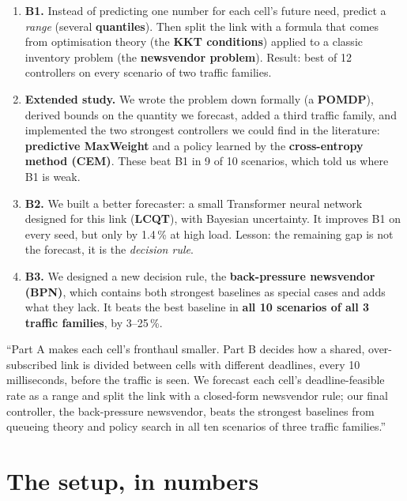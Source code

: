\documentclass[11pt,a4paper]{article}
\begin{document}
\begin{enumerate}
  \item \textbf{B1.} Instead of predicting one number for each cell's future need, predict a \emph{range} (several \textbf{quantiles}). Then split the link with a formula that comes from optimisation theory (the \textbf{KKT conditions}) applied to a classic inventory problem (the \textbf{newsvendor problem}). Result: best of 12 controllers on every scenario of two traffic families.
  \item \textbf{Extended study.} We wrote the problem down formally (a \textbf{POMDP}), derived bounds on the quantity we forecast, added a third traffic family, and implemented the two strongest controllers we could find in the literature: \textbf{predictive MaxWeight} and a policy learned by the \textbf{cross-entropy method (CEM)}. These beat B1 in 9 of 10 scenarios, which told us where B1 is weak.
  \item \textbf{B2.} We built a better forecaster: a small Transformer neural network designed for this link (\textbf{LCQT}), with Bayesian uncertainty. It improves B1 on every seed, but only by 1.4\,\% at high load. Lesson: the remaining gap is not the forecast, it is the \emph{decision rule}.
  \item \textbf{B3.} We designed a new decision rule, the \textbf{back-pressure newsvendor (BPN)}, which contains both strongest baselines as special cases and adds what they lack. It beats the best baseline in \textbf{all 10 scenarios of all 3 traffic families}, by 3--25\,\%.
\end{enumerate}

\begin{say}
``Part A makes each cell's fronthaul smaller. Part B decides how a shared, over-subscribed link is divided between cells with different deadlines, every 10 milliseconds, before the traffic is seen. We forecast each cell's deadline-feasible rate as a range and split the link with a closed-form newsvendor rule; our final controller, the back-pressure newsvendor, beats the strongest baselines from queueing theory and policy search in all ten scenarios of three traffic families.''
\end{say}

\section{The setup, in numbers}
\end{document}
